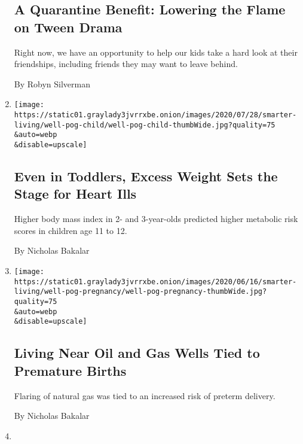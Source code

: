 \begin{enumerate}
{  \subsection{A Quarantine Benefit: Lowering the Flame on Tween
  Drama}\label{a-quarantine-benefit-lowering-the-flame-on-tween-drama}}

  Right now, we have an opportunity to help our kids take a hard look at
  their friendships, including friends they may want to leave behind.

  By Robyn Silverman
\item
  \href{/2020/07/23/well/family/even-in-toddlers-excess-weight-sets-the-stage-for-heart-ills.html}{}

  \texttt{[image: https://static01.graylady3jvrrxbe.onion/images/2020/07/28/smarter-living/well-pog-child/well-pog-child-thumbWide.jpg?quality=75\\\&auto=webp\\\&disable=upscale]}

  \hypertarget{even-in-toddlers-excess-weight-sets-the-stage-for-heart-ills}{%
  \subsection{Even in Toddlers, Excess Weight Sets the Stage for Heart
  Ills}\label{even-in-toddlers-excess-weight-sets-the-stage-for-heart-ills}}

  Higher body mass index in 2- and 3-year-olds predicted higher
  metabolic risk scores in children age 11 to 12.

  By Nicholas Bakalar
\item
  \href{/2020/07/22/well/family/oil-gas-wells-premature-births-pregnancy.html}{}

  \texttt{[image: https://static01.graylady3jvrrxbe.onion/images/2020/06/16/smarter-living/well-pog-pregnancy/well-pog-pregnancy-thumbWide.jpg?quality=75\\\&auto=webp\\\&disable=upscale]}

  \hypertarget{living-near-oil-and-gas-wells-tied-to-premature-births}{%
  \subsection{Living Near Oil and Gas Wells Tied to Premature
  Births}\label{living-near-oil-and-gas-wells-tied-to-premature-births}}

  Flaring of natural gas was tied to an increased risk of preterm
  delivery.

  By Nicholas Bakalar
\item
  \href{/2020/07/22/style/crispr-gene-editing-ethics.html}{}


\end{enumerate}

